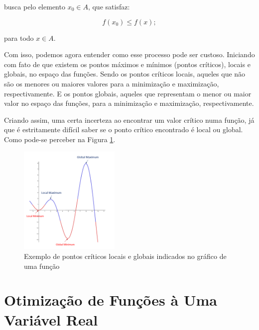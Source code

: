                 busca pelo elemento \(x_0 \in A\), que satisfaz:

                    \begin{equation}
                        f(x_0) \leq f(x);
                    \end{equation}

                para todo \(x \in A\).

\vspace{\baselineskip}
Com isso, podemos agora entender como esse processo pode ser custoso. Iniciando
com fato de que existem os pontos máximos e mínimos (pontos críticos), locais
e globais, no espaço das funções. Sendo os pontos críticos locais, aqueles que
não são os menores ou maiores valores para a minimização e maximização,
respectivamente. E os pontos globais, aqueles que representam o menor ou maior
valor no espaço das funções, para a minimização e maximização, respectivamente.

Criando assim, uma certa incerteza ao encontrar um valor crítico numa função,
já que é estritamente difícil saber se o ponto crítico encontrado é local ou
global. Como pode-se perceber na Figura
\ref{grafico_local_global_pontosCriticos}.


\begin{figure}[h]
    \includegraphics[width=0.43\textwidth]
        {src/grafico_local_global_pontosCriticos.png}
    \centering
    \caption{Exemplo de pontos críticos locais e globais indicados no gráfico
        de uma função}
    \label{grafico_local_global_pontosCriticos}
\end{figure}


\section{{Otimização de Funções à Uma Variável Real}}

\hspace{0.8cm}

